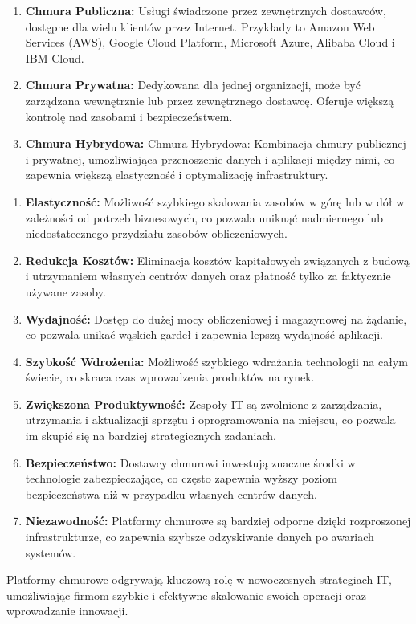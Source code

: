 
\begin{enumerate}
    \item {\bf Chmura Publiczna:} Usługi świadczone przez zewnętrznych dostawców, dostępne dla wielu klientów przez Internet. Przykłady to Amazon Web Services (AWS), Google Cloud Platform, Microsoft Azure, Alibaba Cloud i IBM Cloud.
    \item {\bf  Chmura Prywatna:} Dedykowana dla jednej organizacji, może być zarządzana wewnętrznie lub przez zewnętrznego dostawcę. Oferuje większą kontrolę nad zasobami i bezpieczeństwem.
    \item {\bf Chmura Hybrydowa:} Chmura Hybrydowa: Kombinacja chmury publicznej i prywatnej, umożliwiająca przenoszenie danych i aplikacji między nimi, co zapewnia większą elastyczność i optymalizację infrastruktury.
\end{enumerate} 

\begin{enumerate}
    \item {\bf Elastyczność:}  Możliwość szybkiego skalowania zasobów w górę lub w dół w zależności od potrzeb biznesowych, co pozwala uniknąć nadmiernego lub niedostatecznego przydziału zasobów obliczeniowych.
    \item {\bf Redukcja Kosztów:}  Eliminacja kosztów kapitałowych związanych z budową i utrzymaniem własnych centrów danych oraz płatność tylko za faktycznie używane zasoby.
    \item {\bf Wydajność:} Dostęp do dużej mocy obliczeniowej i magazynowej na żądanie, co pozwala unikać wąskich gardeł i zapewnia lepszą wydajność aplikacji.
    \item {\bf Szybkość Wdrożenia:} Możliwość szybkiego wdrażania technologii na całym świecie, co skraca czas wprowadzenia produktów na rynek.
    \item {\bf Zwiększona Produktywność:} Zespoły IT są zwolnione z zarządzania, utrzymania i aktualizacji sprzętu i oprogramowania na miejscu, co pozwala im skupić się na bardziej strategicznych zadaniach.
    \item {\bf Bezpieczeństwo:} Dostawcy chmurowi inwestują znaczne środki w technologie zabezpieczające, co często zapewnia wyższy poziom bezpieczeństwa niż w przypadku własnych centrów danych.
    \item {\bf Niezawodność:} Platformy chmurowe są bardziej odporne dzięki rozproszonej infrastrukturze, co zapewnia szybsze odzyskiwanie danych po awariach systemów.
    
\end{enumerate}
Platformy chmurowe odgrywają kluczową rolę w nowoczesnych strategiach IT, umożliwiając firmom szybkie i efektywne skalowanie swoich operacji oraz wprowadzanie innowacji.

